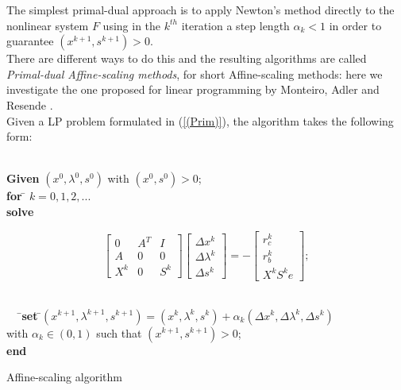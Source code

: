 \documentclass[a4paper,10 pt,titlepage,twoside]{book}
\theoremstyle{plain}
\theoremstyle{definition}
\theoremstyle{remark}
\begin{document}
The simplest primal-dual approach is to apply Newton's method directly to the nonlinear system $F$ using in the $k^{th}$ iteration a step length $\alpha_{k}<1$ in order to guarantee $(x^{k+1},s^{k+1})>0$.\\ There are different ways to do this and the resulting algorithms are called \textit{Primal-dual Affine-scaling methods}, for short Affine-scaling methods: here we investigate the one proposed for linear programming by Monteiro,
Adler and Resende \cite{MARE}.\\ 
Given a LP problem formulated in (\ref{(Prim)}), the algorithm takes the following form:\\
\begin{algorithm}[H]\label{algaff}
\begin{tabbing}
	\\
	\textbf{Given} $(x^{0}, \lambda^{0}, s^{0})$ with $(x^{0}, s^{0})>0$;\\
	\textbf{for} \= $k = 0, 1, 2,...$ \\
	\> \textbf{solve}
	\end{tabbing}
\begin{equation}\label{mtx:aff}\tag{4.2b}	
\begin{bmatrix}
0&A^{T}&I \\A& 0&0\\X^{k}&0&S^{k}
\end{bmatrix}\begin{bmatrix}
\Delta x^{k}\\\Delta\lambda^{k} \\\Delta s^{k}
\end{bmatrix}=-\begin{bmatrix}
r_{c}^{k}\\r_{b}^{k}\\X^{k}S^{k}e
\end{bmatrix};
\end{equation}
\begin{tabbing}
	\\$\;\;\;\;\;$\=
	\>\textbf{set} \=$(x^{k+1}, \lambda^{k+1}, s^{k+1}) = (x^{k}, \lambda^{k}, s^{k})+ \alpha_{k}(\Delta x^{k}, \Delta\lambda^{k}, \Delta s^{k})$
	\\
	\>\> with $\alpha_{k}\in(0,1)$ such that $(x^{k+1}, s^{k+1})>0$; \\
	\textbf{end}
\end{tabbing}
\caption{\label{alg:AS}Affine-scaling algorithm}
\end{algorithm}
\end{document}
